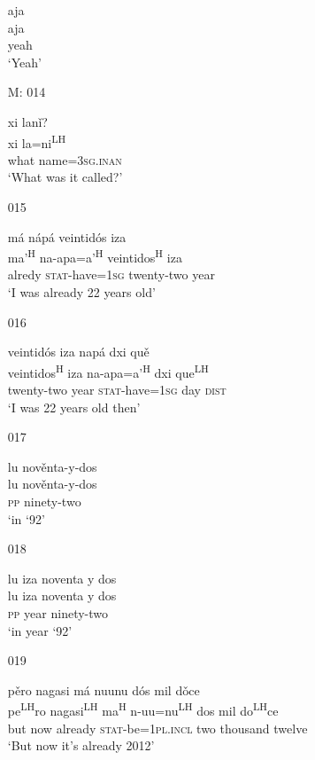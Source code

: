 \begin{itemize}
\glll aja\\
aja\\
yeah \\
\glt `Yeah'
 

\item[M: 014]
   
\glll xi lan\v{i}?\\
xi la=ni\textsuperscript{LH}\\
what name=\textsc{3sg.inan}\\
\glt `What was it called?'
 

\item[015]
   
\glll m\'{a} n\'{a}p\'{a} veintid\'{o}s iza\\
ma'\textsuperscript{H} na-apa=a'\textsuperscript{H} veintidos\textsuperscript{H} iza\\
alredy \textsc{stat}-have=\textsc{1sg} twenty-two year\\
\glt `I was already 22 years old'
 

\item[016]
   
\glll veintid\'{o}s iza nap\'{a} dxi qu\v{e}\\ 
veintidos\textsuperscript{H} iza na-apa=a'\textsuperscript{H} dxi que\textsuperscript{LH}\\
twenty-two year \textsc{stat}-have=\textsc{1sg} day \textsc{dist}\\
\glt `I was 22 years old then'
 

\item[017]
   
\glll lu nov\v{e}nta-y-dos\\
 lu nov\v{e}nta-y-dos\\
 \textsc{pp} ninety-two\\
\glt `in `92'
 

\item[018]
  
\glll  lu iza noventa y dos\\
lu iza noventa y dos\\
\textsc{pp} year ninety-two\\
\glt `in year `92'
 

\item[019]
   
\glll p\v{e}ro nagasi m\'{a} nuunu d\'{o}s mil d\v{o}ce\\
pe\textsuperscript{LH}ro nagasi\textsuperscript{LH} ma\textsuperscript{H} n-uu=nu\textsuperscript{LH} dos mil do\textsuperscript{LH}ce\\
but now already \textsc{stat}-be=\textsc{1pl.incl} two thousand twelve\\
\glt `But now it's already 2012'
 


\end{itemize}
